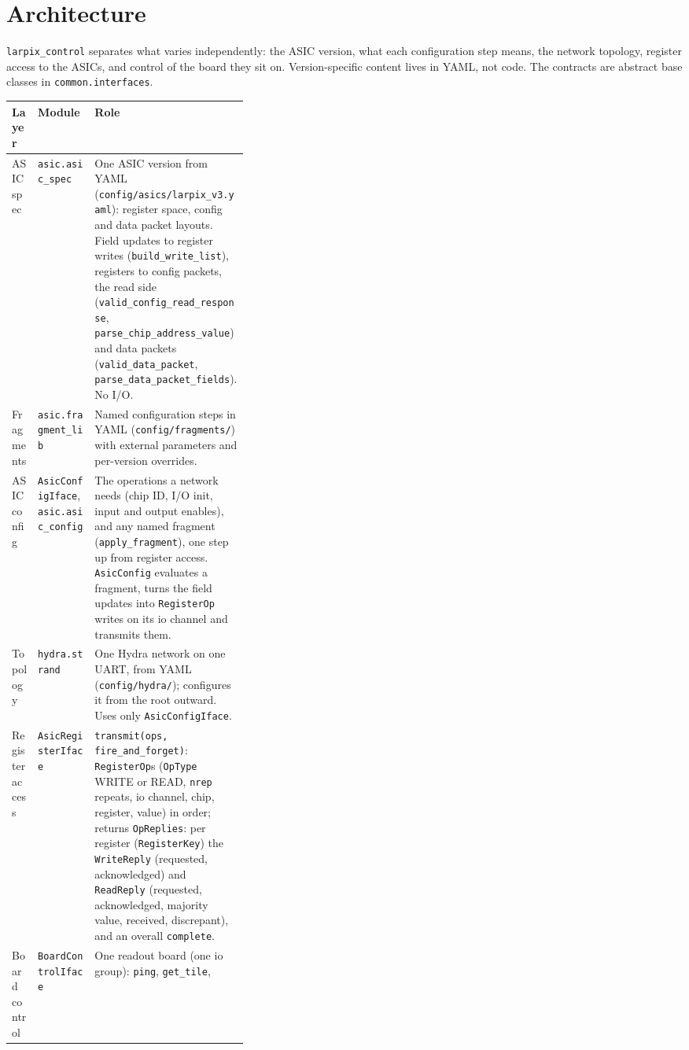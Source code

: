 \documentclass[11pt]{article}
\newcommand{\h}[1]{\texttt{#1}}
\begin{document}
\section{Architecture}

\h{larpix\_control} separates what varies independently:  the ASIC version, what each configuration step means, the
network topology, register access to the ASICs, and control of the board they sit on.  Version-specific content
lives in YAML, not code.  The contracts are abstract base classes in \h{common.interfaces}.

\begin{center}
\small
\begin{tabularx}{\linewidth}{@{}P{0.11\linewidth} P{0.24\linewidth} L@{}}
\toprule
Layer & Module & Role \\
\midrule
ASIC spec & \h{asic.\allowbreak asic\_spec} & One ASIC version from YAML (\h{config/asics/larpix\_v3.yaml}):  register
  space, config and data packet layouts.  Field updates to register writes (\h{build\_write\_list}), registers to
  config packets, the read side (\h{valid\_config\_read\_response}, \h{parse\_chip\_address\_value}) and data
  packets (\h{valid\_data\_packet}, \h{parse\_data\_packet\_fields}).  No I/O. \\
Fragments & \h{asic.\allowbreak fragment\_lib} & Named configuration steps in YAML (\h{config/fragments/}) with
  external parameters and per-version overrides. \\
ASIC config & \h{AsicConfigIface}, \h{asic.\allowbreak asic\_config} & The operations a network needs (chip ID, I/O
  init, input and output enables), and any named fragment (\h{apply\_fragment}), one step up from register access.
  \h{AsicConfig} evaluates a fragment, turns the field updates into \h{RegisterOp} writes on its io channel and
  transmits them. \\
Topology & \h{hydra.\allowbreak strand} & One Hydra network on one UART, from YAML (\h{config/hydra/});  configures
  it from the root outward.  Uses only \h{AsicConfigIface}. \\
Register access & \h{AsicRegisterIface} & \h{transmit(ops, fire\_and\_forget)}:  \h{RegisterOp}s
  (\h{OpType} WRITE or READ, \h{nrep} repeats, io channel, chip, register, value) in order;  returns \h{OpReplies}:
  per register (\h{RegisterKey}) the \h{WriteReply} (requested, acknowledged) and \h{ReadReply} (requested,
  acknowledged, majority value, received, discrepant), and an overall \h{complete}. \\
Board control & \h{BoardControlIface} & One readout board (one io group):  \h{ping}, \h{get\_tile},

\end{tabularx}
\end{center}
\end{document}
